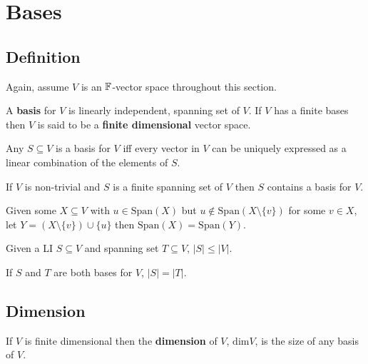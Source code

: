 \section{Bases}

\subsection{Definition}
Again, assume $V$ is an $\mathbb{F}$-vector space throughout this section.
\begin{definition}[Bases]
    A \textbf{basis} for $V$ is linearly independent, spanning set of $V$. If $V$ has a finite bases then $V$ is said to be a \textbf{finite dimensional} vector space.
\end{definition}

\begin{theorem}
    Any $S\subseteq V$ is a basis for $V$ iff every vector in $V$ can be uniquely expressed as a linear combination of the elements of $S$.
\end{theorem}

\begin{theorem}
    If $V$ is non-trivial and $S$ is a finite spanning set of $V$ then $S$ contains a basis for $V$.
\end{theorem}

\begin{lemma}
    Given some $X\subseteq V$ with $u\in \text{Span}(X)$ but $u\not\in \text{Span}(X\setminus \{v\})$ for some $v\in X$, let $Y=(X\setminus \{v\})\cup \{u\}$ then $\text{Span}(X) = \text{Span}(Y)$.
\end{lemma}

\begin{theorem}
    Given a LI $S\subseteq V$ and spanning set $T\subseteq V$, $|S|\leq|V|$.
\end{theorem}

\begin{corollary}
    If $S$ and $T$ are both bases for $V$, $|S|=|T|$.
\end{corollary}

\subsection{Dimension}

\begin{definition}
    If $V$ is finite dimensional then the \textbf{dimension} of $V$, $\text{dim}V$, is the size of any basis of $V$.
\end{definition}

